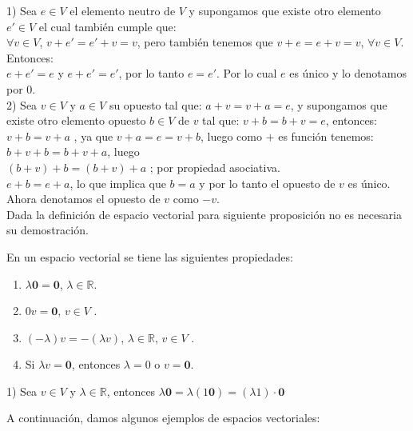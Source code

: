 		\begin{demo}
			1) Sea $e\in V$ el elemento neutro de $V$ y supongamos que existe otro elemento $e' \in V$ el cual también cumple que:\\
			$\forall v\in V$, $v+ e'=e'+v= v$, pero también tenemos que $v+ e=e+v= v$, $\forall v \in V$. Entonces:\\
			$ e + e' = e $ y $ e + e' =e' $, por lo tanto $e=e'$. Por lo cual $e$ es único y lo denotamos por $0$.\\[0.2cm]
			2) Sea $v\in V$ y $a\in V$ su opuesto tal que: $a+v=v+a=e$, y supongamos que existe otro elemento opuesto $b \in V$ de $v$ tal que: $v+b=b+v=e$, entonces:\\
			$v+b=v+a$ , ya que $v+a=e=v+b$, luego como $+$ es función tenemos:\\
			$b+v+b=b+v+a$, luego \\
			$(b+v)+ b=(b+v)+a$ ; por propiedad asociativa.\\
			$ e+b=e+a$,  lo que implica que $b=a$ y por lo tanto el opuesto de $v$ es único. Ahora denotamos el opuesto de $v$ como $-v$.\\
			Dada la definición de espacio vectorial para siguiente proposición no es necesaria su demostración.\\[0.3cm]
		\end{demo}
		
		\begin{pro} En un espacio vectorial se tiene las siguientes propiedades:
		\begin{enumerate}
			\item $\lambda \textbf{0} = \textbf{0}$, $\lambda \in \mathbb{R}$.
			\item $0v = \textbf{0}$, $v \in V$ .
			\item  $(-\lambda)v = -(\lambda v)$, $\lambda \in \mathbb{R}$,  $v \in V$ .
			\item Si $\lambda v = \textbf{0}$, entonces $\lambda = 0$ o $v = \textbf{0}$.
		\end{enumerate}
		\end{pro}
		\begin{demo}
		 	1) Sea $ v \in V$ y $\lambda \in \mathbb{R}$, entonces $\lambda{\textbf{0}} = \lambda(1\textbf{0}) = (\lambda1)  \cdot \textbf{0}$
		\end{demo}
		
		A continuación, damos algunos ejemplos de espacios vectoriales:\\
		
